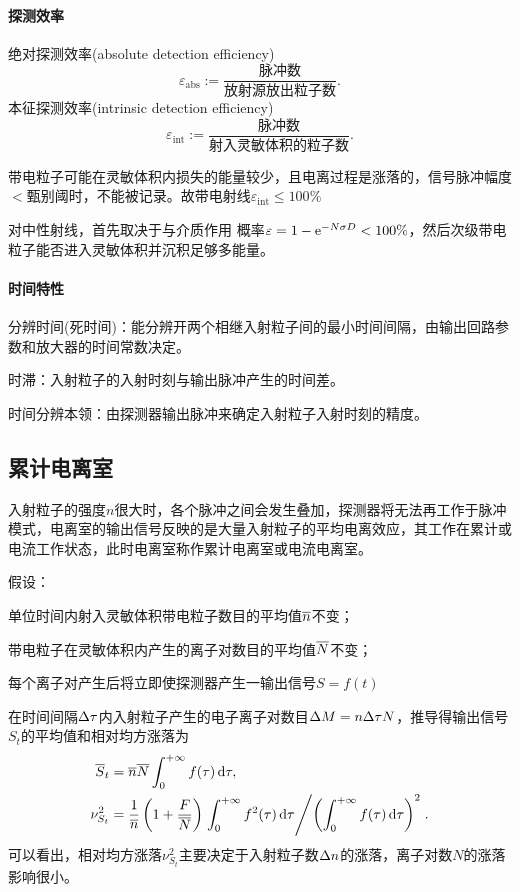 \paragraph{探测效率}
绝对探测效率(absolute detection efficiency)
\[
	\varepsilon_{\mathrm{abs}}:=\frac{\text{脉冲数}}{\text{放射源放出粒子数}}.
\]
本征探测效率(intrinsic detection efficiency)
\[
	\varepsilon_{\mathrm{int}}:=\frac{\text{脉冲数}}{\text{射入灵敏体积的粒子数}}.
\]

带电粒子可能在灵敏体积内损失的能量较少，且电离过程是涨落的，信号脉冲幅度$<$甄别阈时，不能被记录。故带电射线$\varepsilon_{\mathrm{int}}\leqslant 100\%$

对中性射线，首先取决于与介质作用%
概率$\varepsilon=1-\mathop{}\!\mathrm{e}^{-N\sigma D}<100\%$，然后次级带电粒子能否进入灵敏体积并沉积足够多能量。
\paragraph{时间特性}
分辨时间(死时间)：能分辨开两个相继入射粒子间的最小时间间隔，由输出回路参数和放大器的时间常数决定。

时滞：入射粒子的入射时刻与输出脉冲产生的时间差。

时间分辨本领：由探测器输出脉冲来确定入射粒子入射时刻的精度。
\subsection{累计电离室}
入射粒子的强度$n$很大时，各个脉冲之间会发生叠加，探测器将无法再工作于脉冲模式，电离室的输出信号反映的是大量入射粒子的平均电离效应，其工作在累计或电流工作状态，此时电离室称作累计电离室或电流电离室。


假设：
\begin{compactenum}
	\item 单位时间内射入灵敏体积带电粒子数目的平均值$\overline n$不变；
	\item 带电粒子在灵敏体积内产生的离子对数目的平均值$\overline N$不变；
	\item 每个离子对产生后将立即使探测器产生一输出信号$S=f(t)$
\end{compactenum}
在时间间隔$\Delta\tau$内入射粒子产生的电子离子对数目$\Delta M=n\Delta\tau N$，推导得输出信号$S_t$的平均值和相对均方涨落为
\begin{align*}
	\overline S_t&=\overline n\overline N\int_0^{+\infty} f(\tau)\mathop{}\!\mathrm{d}\tau,\\
	\nu_{S_t}^2&=\frac1{\overline n}\left(1+\frac F{\overline N}\right)\left.\int_0^{+\infty} f^2(\tau)\mathop{}\!\mathrm{d}\tau\middle\slash \left(\int_0^{+\infty} f(\tau)\mathop{}\!\mathrm{d}\tau\right)^2\right..
\end{align*}
可以看出，相对均方涨落$\nu_{S_t}^2$主要决定于入射粒子数$\Delta n$的涨落，离子对数$N$的涨落影响很小。
